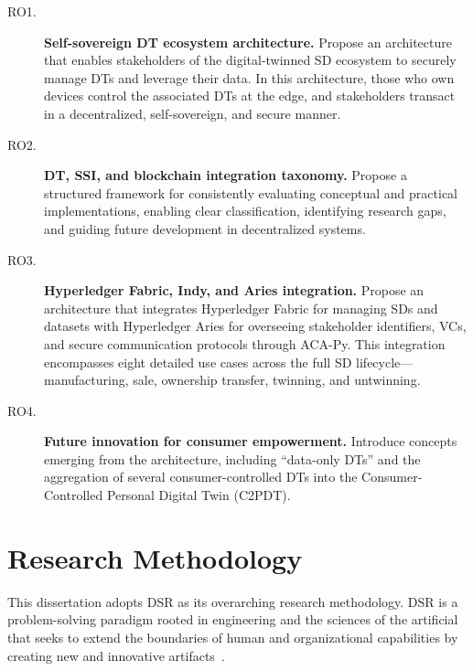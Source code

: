 \begin{description}
    \item[RO1.] \textbf{Self-sovereign \ac{DT} ecosystem architecture.} Propose an architecture that enables stakeholders of the digital-twinned \ac{SD} ecosystem to securely manage \acp{DT} and leverage their data. In this architecture, those who own devices control the associated \acp{DT} at the edge, and stakeholders transact in a decentralized, self-sovereign, and secure manner.

    \item[RO2.] \textbf{\ac{DT}, \ac{SSI}, and blockchain integration taxonomy.} Propose a structured framework for consistently evaluating conceptual and practical implementations, enabling clear classification, identifying research gaps, and guiding future development in decentralized systems.

    \item[RO3.] \textbf{Hyperledger Fabric, Indy, and Aries integration.} Propose an architecture that integrates Hyperledger Fabric for managing \acp{SD} and datasets with Hyperledger Aries for overseeing stakeholder identifiers, \acp{VC}, and secure communication protocols through ACA-Py. This integration encompasses eight detailed use cases across the full \ac{SD} lifecycle---manufacturing, sale, ownership transfer, twinning, and untwinning.

    \item[RO4.] \textbf{Future innovation for consumer empowerment.} Introduce concepts emerging from the architecture, including ``data-only \acp{DT}'' and the aggregation of several consumer-controlled \acp{DT} into the Consumer-Controlled Personal Digital Twin (\ac{C2PDT}).
\end{description}

\section{Research Methodology}
\label{sec:methodology}

\noindent This dissertation adopts \ac{DSR} as its overarching research methodology.
\ac{DSR} is a problem-solving paradigm rooted in engineering and the sciences of the artificial~\cite{simon:1996} that seeks to extend the boundaries of human and organizational capabilities by creating new and innovative artifacts~\cite{hevner:march:park:ram:2004}.

